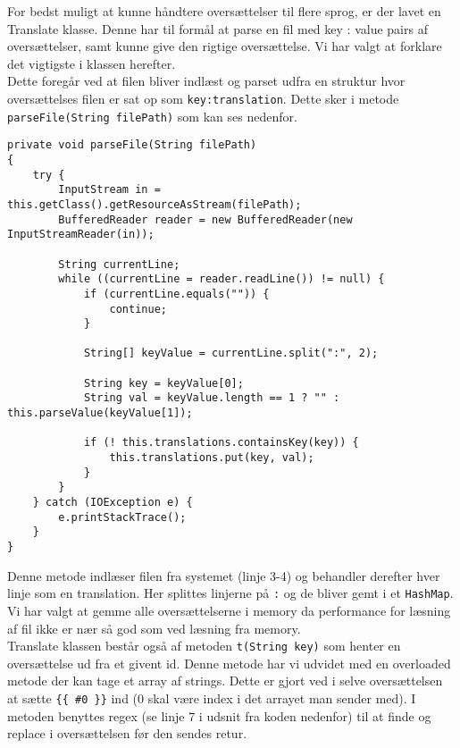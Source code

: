 For bedst muligt at kunne håndtere oversættelser til flere sprog, er der lavet en Translate klasse.
Denne har til formål at parse en fil med key : value pairs af oversættelser, samt kunne give den rigtige oversættelse.
Vi har valgt at forklare det vigtigste i klassen herefter.
\\

\noindent Dette foregår ved at filen bliver indlæst og parset udfra en struktur hvor oversættelses filen er sat op som \lstinline{key:translation}.
Dette sker i metode \lstinline{parseFile(String filePath)} som kan ses nedenfor.

\begin{lstlisting}
private void parseFile(String filePath)
{
    try {
        InputStream in = this.getClass().getResourceAsStream(filePath);
        BufferedReader reader = new BufferedReader(new InputStreamReader(in));

        String currentLine;
        while ((currentLine = reader.readLine()) != null) {
            if (currentLine.equals("")) {
                continue;
            }

            String[] keyValue = currentLine.split(":", 2);

            String key = keyValue[0];
            String val = keyValue.length == 1 ? "" : this.parseValue(keyValue[1]);

            if (! this.translations.containsKey(key)) {
                this.translations.put(key, val);
            }
        }
    } catch (IOException e) {
        e.printStackTrace();
    }
}
\end{lstlisting}
\vspace{2ex}

\noindent Denne metode indlæser filen fra systemet (linje 3-4) og behandler derefter hver linje som en translation.
Her splittes linjerne på \lstinline{:} og de bliver gemt i et \lstinline{HashMap}.
Vi har valgt at gemme alle oversættelserne i memory da performance for læsning af fil ikke er nær så god som ved læsning fra memory.
\\

\noindent Translate klassen består også af metoden \lstinline{t(String key)} som henter en oversættelse ud fra et givent id.
Denne metode har vi udvidet med en overloaded metode der kan tage et array af strings.
Dette er gjort ved i selve oversættelsen at sætte \lstinline!{{ #0 }}! ind (0 skal være index i det arrayet man sender med).
I metoden benyttes regex (se linje 7 i udsnit fra koden nedenfor) til at finde og replace i oversættelsen før den sendes retur.


